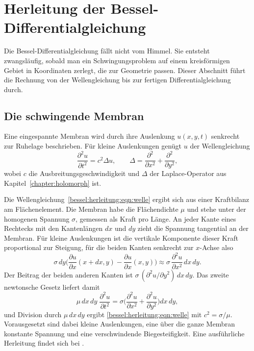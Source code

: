 %
%
%
%
\section{Herleitung der Bessel-Differentialgleichung
\label{bessel:section:herleitung}}
Die Bessel-Differentialgleichung fällt nicht vom Himmel.
Sie entsteht zwangsläufig, sobald man ein Schwingungsproblem auf einem kreisförmigen Gebiet in Koordinaten zerlegt, die zur Geometrie passen.
Dieser Abschnitt führt die Rechnung von der Wellengleichung bis zur fertigen Differentialgleichung durch.
%
%
\subsection{Die schwingende Membran
\label{bessel:herleitung:subsection:membran}}
Eine eingespannte Membran wird durch ihre Auslenkung $u(x,y,t)$ senkrecht zur Ruhelage beschrieben.
%
Für kleine Auslenkungen genügt $u$ der Wellengleichung
%
\begin{equation}
\frac{\partial^2 u}{\partial t^2}
=
c^2 \Delta u,
\qquad
\Delta
=
\frac{\partial^2}{\partial x^2}
+
\frac{\partial^2}{\partial y^2},
\label{bessel:herleitung:eqn:welle}
\end{equation}
wobei $c$ die Ausbreitungsgeschwindigkeit und $\Delta$ der Laplace-Operator aus Kapitel~\ref{chapter:holomorph} ist.

Die Wellengleichung~\eqref{bessel:herleitung:eqn:welle} ergibt sich aus einer Kraftbilanz am Flächenelement.
Die Membran habe die Flächendichte $\mu$ und stehe unter der homogenen Spannung $\sigma$, gemessen als Kraft pro Länge.
An jeder Kante eines Rechtecks mit den Kantenlängen $dx$ und $dy$ zieht die Spannung tangential an der Membran.
Für kleine Auslenkungen ist die vertikale Komponente dieser Kraft proportional zur Steigung, für die beiden Kanten senkrecht zur $x$-Achse also
\[
\sigma\,dy
\biggl(
\frac{\partial u}{\partial x}(x+dx,y)
-
\frac{\partial u}{\partial x}(x,y)
\biggr)
\approx
\sigma\,
\frac{\partial^2 u}{\partial x^2}\,
dx\, dy .
\]
Der Beitrag der beiden anderen Kanten ist $\sigma\,(\partial^2 u/\partial y^2)\,dx\,dy$.
Das zweite newtonsche Gesetz liefert damit
%
\[
\mu\, dx\, dy\;
\frac{\partial^2 u}{\partial t^2}
=
\sigma
\biggl(
\frac{\partial^2 u}{\partial x^2}
+
\frac{\partial^2 u}{\partial y^2}
\biggr)
dx\, dy ,
\]
und Division durch $\mu\,dx\,dy$ ergibt \eqref{bessel:herleitung:eqn:welle} mit $c^2 = \sigma/\mu$.
Vorausgesetzt sind dabei kleine Auslenkungen, eine über die ganze Membran konstante Spannung und eine verschwindende Biegesteifigkeit.
Eine ausführliche Herleitung findet sich bei \cite{bessel:courant}.

